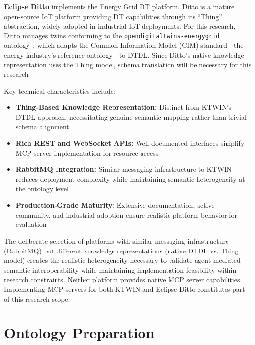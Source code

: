 \textbf{Eclipse Ditto} implements the Energy Grid DT platform.
Ditto is a mature open-source IoT platform providing
    DT capabilities through its ``Thing'' abstraction,
    widely adopted in industrial IoT deployments.
For this research, Ditto manages twins conforming to the
    \texttt{opendigitaltwins-energygrid} ontology~\cite{raviAzureOpendigitaltwinsenergygrid2021}, which adapts the
    Common Information Model (CIM) standard---the energy industry's reference ontology---to DTDL.
Since Ditto's native knowledge representation uses the Thing model,
    schema translation will be necessary for this research.

Key technical characteristics include:

\begin{itemize}
    \item \textbf{Thing-Based Knowledge Representation:}
    Distinct from KTWIN's DTDL approach,
        necessitating genuine semantic mapping rather than trivial schema alignment
    
    \item \textbf{Rich REST and WebSocket APIs:}
    Well-documented interfaces simplify MCP server implementation for resource access
    
    \item \textbf{RabbitMQ Integration:}
    Similar messaging infrastructure to KTWIN reduces deployment complexity
        while maintaining semantic heterogeneity at the ontology level
    
    \item \textbf{Production-Grade Maturity:}
    Extensive documentation, active community, and industrial adoption
        ensure realistic platform behavior for evaluation
\end{itemize}

The deliberate selection of platforms with similar
    messaging infrastructure (RabbitMQ) but
    different knowledge representations (native DTDL vs. Thing model)
    creates the realistic heterogeneity necessary to
    validate agent-mediated semantic interoperability while
    maintaining implementation feasibility within research constraints.
Neither platform provides native MCP server capabilities.
Implementing MCP servers for both KTWIN and Eclipse Ditto
    constitutes part of this research scope.

\section{Ontology Preparation}
\label{sec:ontology-preparation}

